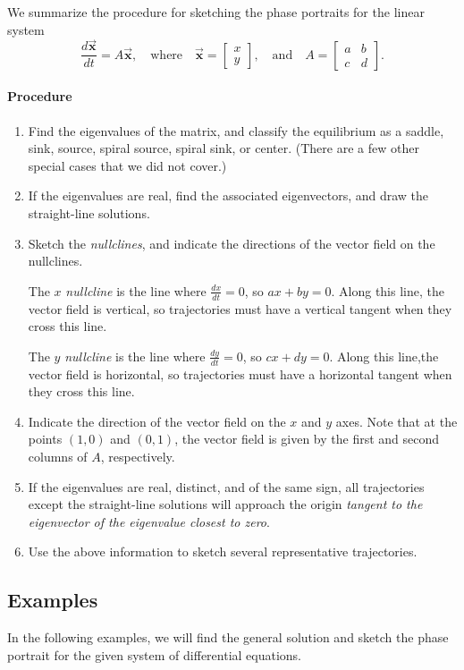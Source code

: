 \documentclass[reqno]{immbook}
\newcommand{\BX}{\vec{\textbf{x}}}
\begin{document}
\noindent
We summarize the procedure for sketching the phase portraits for
the linear system
\[
    \frac{d\BX}{dt} = A\BX, \quad \textrm{where} \quad
    \BX=\begin{bmatrix} x \\ y \end{bmatrix},
    \quad \textrm{and} \quad
    A = \begin{bmatrix} a & b \\ c & d \end{bmatrix}.
\]
\paragraph{Procedure}
\begin{enumerate}
\item
Find the eigenvalues of the matrix, and classify the equilibrium as a
saddle, sink, source, spiral source, spiral sink, or center.
(There are a few other special cases that we did not cover.)
\item
If the eigenvalues are real, find the associated eigenvectors, and
draw the straight-line solutions.
\item  Sketch the \emph{nullclines}, and indicate the
directions of the vector field on the nullclines.

The $x$ \emph{nullcline} is the line where $\frac{dx}{dt}=0$,
so $ax+by=0$. Along this line, the vector field is vertical, so trajectories
must have a vertical tangent when they cross this line.

The $y$ \emph{nullcline} is the line where $\frac{dy}{dt}=0$, so
$cx+dy=0$.  Along this line,the vector field is horizontal, so
trajectories must have a horizontal tangent when they cross this line.
 
\item Indicate the direction of the vector field on the $x$ and $y$ axes.
Note that at the points $(1,0)$ and $(0,1)$, the
vector field is given by the first and second columns of $A$, respectively.
\item
If the eigenvalues are real, distinct, and of the same sign,
all trajectories except the straight-line solutions
will approach the origin \emph{tangent to the eigenvector
of the eigenvalue closest to zero}.
\item Use the above information to sketch several representative trajectories.
\end{enumerate}

\subsection*{Examples}
In the following examples, we will find the general solution and sketch
the phase portrait for the given system of differential equations.
\end{document}
